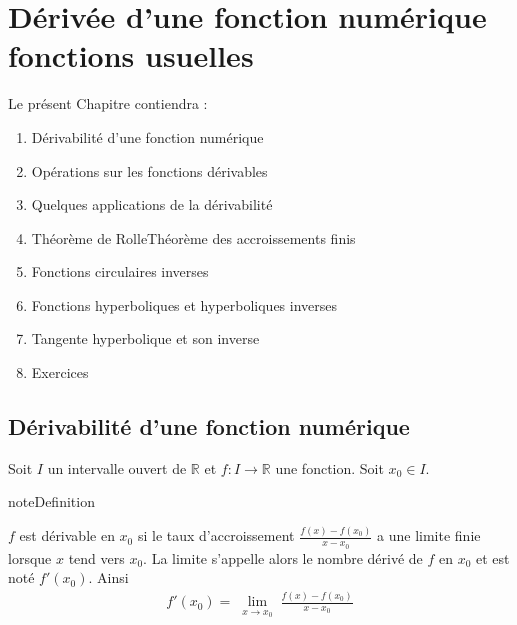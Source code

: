 \documentclass[letterpaper,10pt,french]{jupyterBook}
\begin{document}
\chapter{Dérivée d’une fonction numérique\sphinxhyphen{} fonctions usuelles}
\label{\detokenize{dirivf:derivee-d-une-fonction-numerique-fonctions-usuelles}}\label{\detokenize{dirivf::doc}}
\sphinxAtStartPar
Le présent Chapitre contiendra :
\begin{enumerate}
%
\item {} 
\sphinxAtStartPar
Dérivabilité d’une fonction numérique

\item {} 
\sphinxAtStartPar
Opérations sur les fonctions dérivables

\item {} 
\sphinxAtStartPar
Quelques applications de la dérivabilité

\item {} 
\sphinxAtStartPar
Théorème de Rolle\sphinxhyphen{}Théorème des accroissements finis

\item {} 
\sphinxAtStartPar
Fonctions circulaires inverses

\item {} 
\sphinxAtStartPar
Fonctions hyperboliques et hyperboliques inverses

\item {} 
\sphinxAtStartPar
Tangente hyperbolique et son inverse

\item {} 
\sphinxAtStartPar
Exercices

\end{enumerate}


\section{Dérivabilité d’une fonction numérique}
\label{\detokenize{dirivfs:derivabilite-d-une-fonction-numerique}}\label{\detokenize{dirivfs::doc}}
\sphinxAtStartPar
Soit \(I\) un intervalle ouvert de \(\mathbb{R}\) et \(f:I\rightarrow\mathbb{R}\) une fonction. Soit \(x_0 \in I.\)

\begin{sphinxadmonition}{note}{Definition}

\sphinxAtStartPar
\(f\) est dérivable en \(x_0\) si le taux d’accroissement \(\frac{f(x)-f(x_0)}{x-x_0}\) a une limite finie lorsque \(x\) tend vers \(x_0.\) La limite s’appelle alors le nombre dérivé de \(f\) en \(x_0\) et est noté \(f'(x_0).\) Ainsi
\begin{equation*}
\begin{split}
f'(x_0)=\lim\limits_{\substack{x\rightarrow x_0}}\frac{f(x)-f(x_0)}{x-x_0}
\end{split}
\end{equation*}\end{sphinxadmonition}
\end{document}
